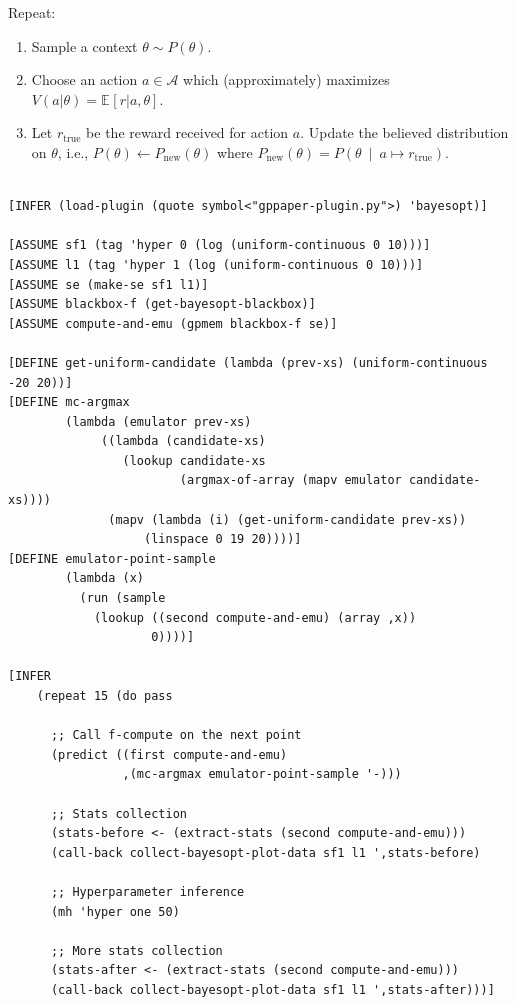 \documentclass[a0,portrait]{a0poster}
\newcommand{\true}{{\textrm{true}}}
\newcommand{\rmnew}{{\textrm{new}}}
\newcommand{\Acal}{\mathcal{A}}
\newcommand{\pn}[1]{\left( #1 \right)}
\newcommand{\bkt}[1]{\left[ #1 \right]}
\newcommand{\Ebkt}[2][]{\mathbb{E}_{#1}\bkt{#2}}
\newcommand{\mvert}{\ \middle\vert\ }
\begin{document}
\begin{multicols}{2}
Repeat:
\begin{enumerate}
 \item Sample a context $\theta \sim P(\theta)$.
 \item Choose an action $a \in \Acal$ which (approximately) maximizes $V(a|\theta) = \Ebkt{r|a,\theta}$.
 \item\label{itm:Thompson-conditioning}
    Let $r_\true$ be the reward received for action $a$.
    Update the believed distribution on $\theta$, i.e., $P(\theta) \gets P_\rmnew(\theta)$ where $P_\rmnew(\theta) = P\pn{\theta \mvert a \mapsto r_\true}$.
\end{enumerate}
 \begin{minipage}{\linewidth}
\small
\begin{lstlisting}[frame=single,label=alg:structureVent,caption=Venture Code for Bayesian Optimization,mathescape]

[INFER (load-plugin (quote symbol<"gppaper-plugin.py">) 'bayesopt)]

[ASSUME sf1 (tag 'hyper 0 (log (uniform-continuous 0 10)))]
[ASSUME l1 (tag 'hyper 1 (log (uniform-continuous 0 10)))]
[ASSUME se (make-se sf1 l1)]
[ASSUME blackbox-f (get-bayesopt-blackbox)]
[ASSUME compute-and-emu (gpmem blackbox-f se)]

[DEFINE get-uniform-candidate (lambda (prev-xs) (uniform-continuous -20 20))]
[DEFINE mc-argmax
        (lambda (emulator prev-xs)
             ((lambda (candidate-xs)
                (lookup candidate-xs
                        (argmax-of-array (mapv emulator candidate-xs))))
              (mapv (lambda (i) (get-uniform-candidate prev-xs))
                   (linspace 0 19 20))))]
[DEFINE emulator-point-sample
        (lambda (x)
          (run (sample
            (lookup ((second compute-and-emu) (array ,x))
                    0))))]

[INFER
    (repeat 15 (do pass

      ;; Call f-compute on the next point
      (predict ((first compute-and-emu)
                ,(mc-argmax emulator-point-sample '-)))

      ;; Stats collection
      (stats-before <- (extract-stats (second compute-and-emu)))
      (call-back collect-bayesopt-plot-data sf1 l1 ',stats-before)

      ;; Hyperparameter inference
      (mh 'hyper one 50)

      ;; More stats collection
      (stats-after <- (extract-stats (second compute-and-emu)))
      (call-back collect-bayesopt-plot-data sf1 l1 ',stats-after)))]


\end{lstlisting}
\end{minipage}
\end{multicols}
\end{document}
